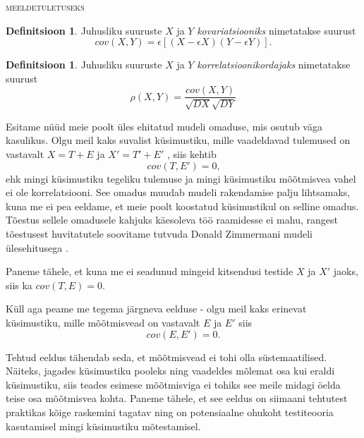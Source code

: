 \documentclass[a4paper,12pt]{article}
\newenvironment{meeldetuletus}{
	\begin{lrbox}{\thisOne}
		\begin{minipage}{0.95\textwidth} \vspace{0.25em} {\scriptsize \textsc{meeldetuletuseks}} \linebreak \vspace{-2em}
} 
{  
 \end{minipage}\end{lrbox}{
 		
 			\begin{mdframed}[tikzsetting={draw=black,dashed,line width=0.5pt, dash pattern = on 10pt off 3pt},%
 			linecolor=background_example,backgroundcolor=background_example,outerlinewidth=1pt]
 			\usebox{\thisOne}
 			\end{mdframed}
 		
 		
 	}
}
\numberwithin{equation}{section}
\theoremstyle{definition}
\newtheorem*{kovariatsioon}{Definitsioon}
\newtheorem*{korrelatsioon}{Definitsioon}
\begin{document}
\begin{meeldetuletus}
\begin{kovariatsioon}
Juhusliku suuruste $X$ ja $Y$ \textit{kovariatsiooniks} nimetatakse suurust
\begin{equation*}
cov(X,Y) = \epsilon \left[  \left( X - \epsilon X \right)\left(Y - \epsilon Y \right) \right]  \text{.}
\end{equation*}
\end{kovariatsioon}
\begin{korrelatsioon}
Juhusliku suuruste $X$ ja $Y$ \textit{korrelatsioonikordajaks} nimetatakse suurust 
\begin{equation*}
\rho (X,Y) = \frac{cov(X,Y)}{\sqrt{DX}\sqrt{DY}} 
\end{equation*}
\end{korrelatsioon}
\end{meeldetuletus}

Esitame nüüd meie poolt üles ehitatud mudeli omaduse, mis osutub väga kasulikus. Olgu meil kaks suvalist küsimustiku, mille vaadeldavad tulemused on vastavalt $X = T + E$ ja $X' = T' + E'$ , siis kehtib 
\begin{equation}
\label{eq:cov_zero}
cov(T,E') = 0 \text{,}
\end{equation} 
ehk mingi küsimustiku tegeliku tulemuse ja mingi küsimustiku mõõtmisvea vahel ei ole korrelatsiooni. See omadus muudab mudeli rakendamise palju lihtsamaks, kuna me ei pea eeldame, et meie poolt koostatud küsimustikul on selline omadus. Tõestus sellele omadusele kahjuks käesoleva töö raamidesse ei mahu, rangest tõestusest huvitatutele soovitame tutvuda Donald Zimmermani mudeli ülesehitusega \cite{Zimmerman1975}.

Paneme tähele, et kuna me ei seadunud mingeid kitsendusi testide $X$ ja $X'$ jaoks, siis ka $cov(T,E) = 0$.  

Küll aga peame me tegema järgneva eelduse - olgu meil kaks erinevat küsimustiku, mille mõõtmisvead on vastavalt $E$ ja $E'$ siis 
\begin{equation}
\label{eq:error_cov_0}
cov(E,E') = 0 \text{.}
\end{equation}

Tehtud eeldus tähendab seda, et mõõtmisvead ei tohi olla süstemaatilised. Näiteks, jagades küsimustiku pooleks ning vaadeldes mõlemat osa kui eraldi küsimustiku, siis teades esimese mõõtmisviga ei tohiks see meile midagi öelda teise osa mõõtmisvea kohta. Paneme tähele, et see eeldus on siimaani tehtutest praktikas kõige raskemini tagatav ning on potensiaalne ohukoht testiteooria kasutamisel mingi küsimustiku mõtestamisel. 
\end{document}
